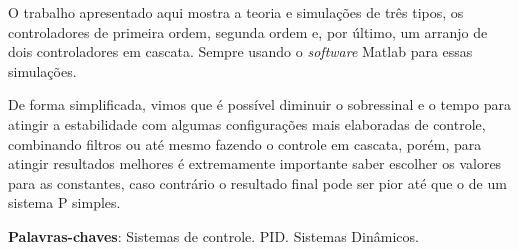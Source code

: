 \documentclass[
	12pt,				%
	openany,			%
	oneside,			%
	a4paper,			%
	english,			%
	french,				%
	spanish,			%
	brazil,				%
	]{abntex2}
\begin{document}

\frenchspacing 


\imprimircapa

\imprimirfolhaderosto*


{
\ABNTEXchapterfont



\setlength{\absparsep}{18pt} %
\begin{resumo}
O trabalho apresentado aqui mostra a teoria e simulações de três tipos, os controladores de primeira ordem, segunda ordem e, por último, um arranjo de dois controladores em cascata. Sempre usando o \textit{software} Matlab para essas simulações. 

De forma simplificada, vimos que é possível diminuir o sobressinal e o tempo para atingir a estabilidade com algumas configurações mais elaboradas de controle, combinando filtros ou até mesmo fazendo o controle em cascata, porém, para atingir resultados melhores é extremamente importante saber escolher os valores para as constantes, caso contrário o resultado final pode ser pior até que o de um sistema P simples.


 \noindent
 \textbf{Palavras-chaves}: Sistemas de controle. PID. Sistemas Dinâmicos.
\end{resumo}

\listoffigures*
\cleardoublepage

\listoftables*
\cleardoublepage


}
\end{document}
